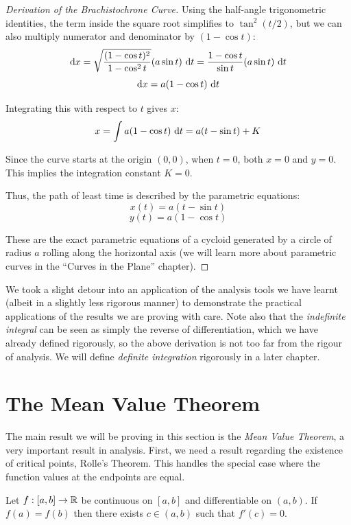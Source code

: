 \documentclass[../analysis1.tex]{subfiles}
\begin{document}
\begin{proof}[Derivation of the Brachistochrone Curve]
    Using the half-angle trigonometric identities, the term inside the square root simplifies to $\tan^2(t/2)$, but we can also multiply numerator and denominator by $(1 - \cos t)$:
    \[ \d x = \sqrt{\frac{(1 - \cos t)^2}{1 - \cos^2 t}} (a \sin t) \, \d t = \frac{1 - \cos t}{\sin t} (a \sin t) \, \d t \]
    \[ \d x = a(1 - \cos t) \, \d t \]
    
    Integrating this with respect to $t$ gives $x$:
    \[ x = \int a(1 - \cos t) \, \d t = a(t - \sin t) + K \]
    
    Since the curve starts at the origin $(0,0)$, when $t = 0$, both $x = 0$ and $y = 0$. This implies the integration constant $K = 0$. 
    
    Thus, the path of least time is described by the parametric equations:
    \[ x(t) = a(t - \sin t) \]
    \[ y(t) = a(1 - \cos t) \]
    
    These are the exact parametric equations of a cycloid generated by a circle of radius $a$ rolling along the horizontal axis (we will learn more about parametric curves in the ``Curves in the Plane'' chapter).
\end{proof}

\begin{remark}
    We took a slight detour into an application of the analysis tools we have learnt (albeit in a slightly less rigorous manner) to demonstrate the practical applications of the results we are proving with care. Note also that the \textit{indefinite integral} can be seen as simply the reverse of differentiation, which we have already defined rigorously, so the above derivation is not too far from the rigour of analysis. We will define \textit{definite integration} rigorously in a later chapter.
\end{remark}

\section{The Mean Value Theorem}

The main result we will be proving in this section is the \textit{Mean Value Theorem}, a very important result in analysis. First, we need a result regarding the existence of critical points, Rolle's Theorem. This handles the special case where the function values at the endpoints are equal.
\begin{theorem}
\label{thm:rolle}
    \begin{shaded*}
        Let $f:[a,b]\to\mathbb{R}$ be continuous on $[a,b]$ and differentiable on $(a,b)$. If $f(a)=f(b)$ then there exists $c\in (a,b)$ such that $f'(c)=0$. 
    \end{shaded*}
\end{theorem}
\end{document}
